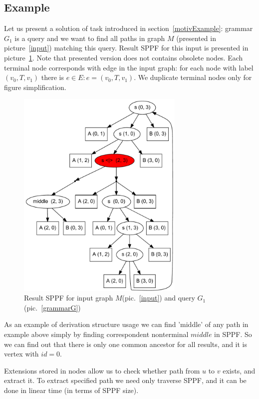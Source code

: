 \subsection{Example}

Let us present a solution of task introduced in section~\ref{motivExample}: grammar $G_1$ is a query and we want to find all paths in graph $M$ (presented in picture~\ref{input}) matching this query.
Result SPPF for this input is presented in picture~\ref{SPPF}. Note that presented version does not contains obsolete nodes.
Each terminal node corresponds with edge in the input graph: for each node with label $(v_0, T, v_1)$ there is $e\in E: e=(v_0,T,v_1)$.
We duplicate terminal nodes only for figure simplification.

\begin{figure}[h]
    \begin{center}
        \includegraphics[width=8cm]{dot/AnBn.pdf}
        \caption{Result SPPF for input graph $M$(pic.~\ref{input}) and query $G_1$(pic.~\ref{grammarG})}
        \label{SPPF}        
    \end{center}
\end{figure}

    
As an example of derivation structure usage we can find 'middle' of any path in example above simply by finding correspondent nonterminal $middle$ in SPPF.
So we can find out that there is only one common ancestor for all results, and it is vertex with $id = 0$. 

Extensions stored in nodes allow us to check whether path from $u$ to $v$ exists, and extract it. 
To extract specified path we need only traverse SPPF, and it can be done in linear time (in terms of SPPF size). 

